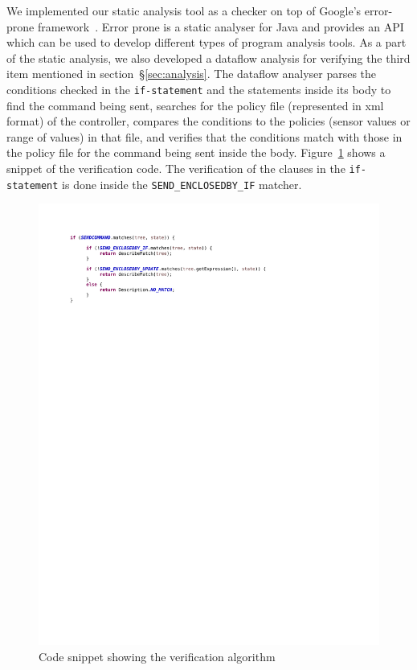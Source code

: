 \documentclass{article}
\begin{document}
We implemented our static analysis tool as a checker on top of Google's error-prone framework~\cite{errorprone}. Error prone is a static analyser for Java and provides an API which can be used to develop different types of program analysis tools. As a part of the static analysis, we also developed a dataflow analysis for verifying the third item mentioned in section~\S\ref{sec:analysis}. The dataflow analyser parses the conditions checked in the \texttt{if-statement} and the statements inside its body to find the command being sent, searches for the policy file (represented in xml format) of the controller, compares the conditions to the policies (sensor values or range of values) in that file, and verifies that the conditions match with those in the policy file for the command being sent inside the body. Figure~\ref{fig:verify1} shows a snippet of the verification code. The verification of the clauses in the \texttt{if-statement} is done inside the \texttt{SEND\_ENCLOSEDBY\_IF} matcher.
\begin{figure}[h]
\begin{center}
\includegraphics[scale=0.7, trim = 0 22cm 0 2cm]{verify1.pdf}
\caption{Code snippet showing the verification algorithm}
\label{fig:verify1}
\end{center}
\end{figure}
\end{document}
